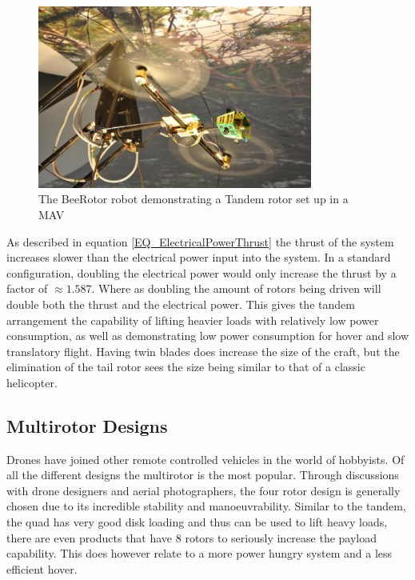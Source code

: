 \begin{figure}[H]
\centering
\includegraphics[height = 6cm]{Images/Literature/TandemBEE}     
\caption{The BeeRotor robot demonstrating a Tandem rotor set up in a MAV \cite{Bee}}
\label{IM_Tandem}
\end{figure}


As described in equation \eqref{EQ_ElectricalPowerThrust} the thrust of the system increases slower than the electrical power input into the system. In a standard configuration, doubling the electrical power would only increase the thrust by a factor of $\approx 1.587$. Where as doubling the amount of rotors being driven will double both the thrust and the electrical power. This gives the tandem arrangement the capability of lifting heavier loads with relatively low power consumption, as well as demonstrating low power consumption for hover and slow translatory flight. Having twin blades does increase the size of the craft, but the elimination of the tail rotor sees the size being similar to that of a classic helicopter.


\subsection{Multirotor Designs}

Drones have joined other remote controlled vehicles in the world of hobbyists. Of all the different designs the multirotor is the most popular. Through discussions with drone designers and aerial photographers, the four rotor design is generally chosen due to its incredible stability and manoeuvrability. Similar to the tandem, the quad has very good disk loading and thus can be used to lift heavy loads, there are even products that have 8 rotors to seriously increase the payload capability. This does however relate to a more power hungry system and a less efficient hover.

